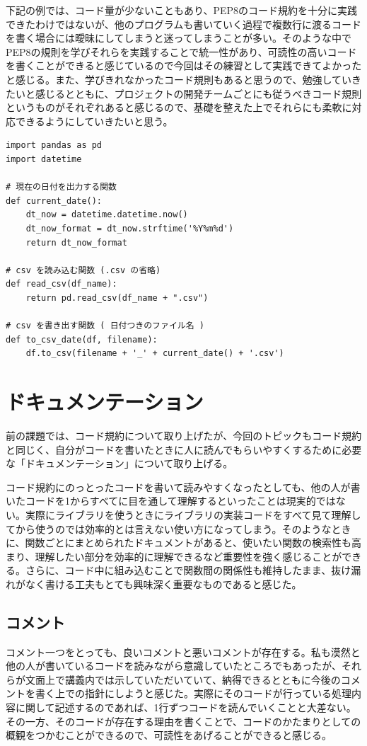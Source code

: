 \documentclass[12pt]{jsarticle}
\begin{document}
下記の例では、コード量が少ないこともあり、PEP8のコード規約を十分に実践できたわけではないが、他のプログラムも書いていく過程で複数行に渡るコードを書く場合には曖昧にしてしまうと迷ってしまうことが多い。そのような中でPEP8の規則を学びそれらを実践することで統一性があり、可読性の高いコードを書くことができると感じているので今回はその練習として実践できてよかったと感じる。また、学びきれなかったコード規則もあると思うので、勉強していきたいと感じるとともに、プロジェクトの開発チームごとにも従うべきコード規則というものがそれぞれあると感じるので、基礎を整えた上でそれらにも柔軟に対応できるようにしていきたいと思う。

\begin{lstlisting}[caption=tips.py]
import pandas as pd
import datetime

# 現在の日付を出力する関数
def current_date():
    dt_now = datetime.datetime.now()
    dt_now_format = dt_now.strftime('%Y%m%d')
    return dt_now_format

# csv を読み込む関数 (.csv の省略)
def read_csv(df_name):
    return pd.read_csv(df_name + ".csv")

# csv を書き出す関数 ( 日付つきのファイル名 )
def to_csv_date(df, filename):
    df.to_csv(filename + '_' + current_date() + '.csv')

\end{lstlisting}

\newpage
\section{ドキュメンテーション}
前の課題では、コード規約について取り上げたが、今回のトピックもコード規約と同じく、自分がコードを書いたときに人に読んでもらいやすくするために必要な「ドキュメンテーション」について取り上げる。

コード規約にのっとったコードを書いて読みやすくなったとしても、他の人が書いたコードを1からすべてに目を通して理解するといったことは現実的ではない。実際にライブラリを使うときにライブラリの実装コードをすべて見て理解してから使うのでは効率的とは言えない使い方になってしまう。そのようなときに、関数ごとにまとめられたドキュメントがあると、使いたい関数の検索性も高まり、理解したい部分を効率的に理解できるなど重要性を強く感じることができる。さらに、コード中に組み込むことで関数間の関係性も維持したまま、抜け漏れがなく書ける工夫もとても興味深く重要なものであると感じた。

\subsection{コメント}
コメント一つをとっても、良いコメントと悪いコメントが存在する。私も漠然と他の人が書いているコードを読みながら意識していたところでもあったが、それらが文面上で講義内では示していただいていて、納得できるとともに今後のコメントを書く上での指針にしようと感じた。実際にそのコードが行っている処理内容に関して記述するのであれば、1行ずつコードを読んでいくことと大差ない。その一方、そのコードが存在する理由を書くことで、コードのかたまりとしての概観をつかむことができるので、可読性をあげることができると感じる。
\end{document}
